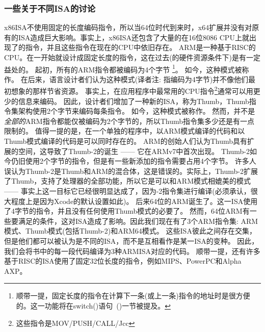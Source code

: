 %
%
%

\subsubsection{一些关于不同\ac{ISA}的讨论}
x86\ac{ISA}不使用固定的长度编码指令，所以当64位时代到来时，x64扩展并没有对原有的\ac{ISA}造成巨大影响。事实上，x86\ac{ISA}还包含了大量的在16位8086 CPU上就出现了的指令，并且这些指令在现在的CPU中依旧存在。
ARM是一种基于\ac{RISC}的\ac{CPU}。在一开始就设计成固定长度的指令，这在过去(的硬件资源条件下)是有一定益处的。
起初，所有的ARM指令都被编码为4个字节%
\footnote{
顺带一提，固定长度的指令在计算下一条(或上一条)指令的地址时是很方便的。这一功能将在switch()语句~()一节被提及。
}。
如今，这种模式被称作。
在后来，语言设计者们认为这种模式(译者注: 指编码为4字节)并不像他们最初想象的那样节省资源。
事实上，在应用程序中最常用的\ac{CPU}指令\footnote{这些指令是MOV/PUSH/CALL/Jcc}通常可以用更少的信息来编码。
因此，设计者们增加了一种新的\ac{ISA}，称为Thumb，Thumb指令集架构使用2个字节来编码每条指令。
如今，这种模式被称作。
然而，并不是\emph{全部的}ARM指令都能仅被编码为2个字节的，所以Thumb指令集多少还是有一点限制的。
值得一提的是，在一个单独的程序中，以ARM模式编译的代码和以Thumb模式编译的代码是可以同时存在的。
ARM的创始人们认为Thumb具有扩展的空间，这导致了Thumb-2的诞生 —— 它在ARMv7中首次出现。
Thumb-2如今仍旧使用2个字节的指令，但是有一些新添加的指令需要占用4个字节。
许多人误认为Thumb-2是Thumb和ARM的混合体，这是错误的。实际上，Thumb-2扩展了Thumb，支持了处理器的全部功能，所以它是可以和ARM模式相媲美的模式 —— 事实上这一目标它已经很明显达成了，因为-2指令集进行编译(必须承认，很大程度上是因为Xcode的默认设置如此)。
后来64位的ARM诞生了。这一\ac{ISA}使用了4字节的指令，并且没有任何使用Thumb模式的必要了。
然而，64位ARM有一些要满足的条件，这对\ac{ISA}造成了影响。因此我们现在有了3个ARM指令集: ARM模式、Thumb模式(包括Thumb-2)和ARM64模式。
这些\ac{ISA}彼此之间存在交集，但是他们都可以被认为是不同的\ac{ISA}，而不是互相看作是某一\ac{ISA}的变种。
因此，我们会将书中的每一段代码编译为3种ARM\ac{ISA}对应的代码。
%
%
%
顺带一提，还有许多基于\ac{RISC}的\ac{ISA}使用了固定32位长度的指令，例如MIPS、PowerPC和Alpha AXP。
